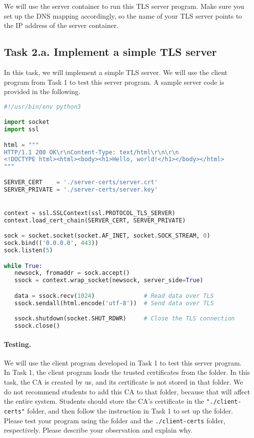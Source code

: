 We will use the server container to run this TLS server program.
Make sure you set up the DNS mapping accordingly, so 
the name of your TLS server points to the IP address of the 
server container. 




\subsection{Task 2.a. Implement a simple TLS server}

In this task, we will implement a simple TLS server. We will
use the client program from Task 1 to test this server program.
A sample server code is provided in the following.


\begin{lstlisting}[caption={\texttt{server.py} (in \texttt{Labsetup/volumes})}, 
                   label={tls:server}, language=Python]
#!/usr/bin/env python3

import socket
import ssl

html = """
HTTP/1.1 200 OK\r\nContent-Type: text/html\r\n\r\n
<!DOCTYPE html><html><body><h1>Hello, world!</h1></body></html>
"""

SERVER_CERT    = './server-certs/server.crt'
SERVER_PRIVATE = './server-certs/server.key'


context = ssl.SSLContext(ssl.PROTOCOL_TLS_SERVER) 
context.load_cert_chain(SERVER_CERT, SERVER_PRIVATE)

sock = socket.socket(socket.AF_INET, socket.SOCK_STREAM, 0)
sock.bind(('0.0.0.0', 443))
sock.listen(5)

while True:
   newsock, fromaddr = sock.accept()
   ssock = context.wrap_socket(newsock, server_side=True)

   data = ssock.recv(1024)              # Read data over TLS
   ssock.sendall(html.encode('utf-8'))  # Send data over TLS

   ssock.shutdown(socket.SHUT_RDWR)     # Close the TLS connection
   ssock.close()
\end{lstlisting}
 


\paragraph{Testing.}
We will use the client program developed in Task 1 to test this 
server program.
In Task 1, the client program loads the trusted certificates from the 
 folder. 
In this task, the CA is created by us, and its
certificate is not stored in that folder. We do not recommend students 
to add this CA to that folder, because that will affect the entire 
system. Students should store the CA's certificate in 
the \texttt{"./client-certs"} folder, and then follow the instruction
in Task 1 to set up the folder. 
Please test your program using the  folder
and the \texttt{./client-certs} folder, respectively. 
Please describe your observation and explain why.



